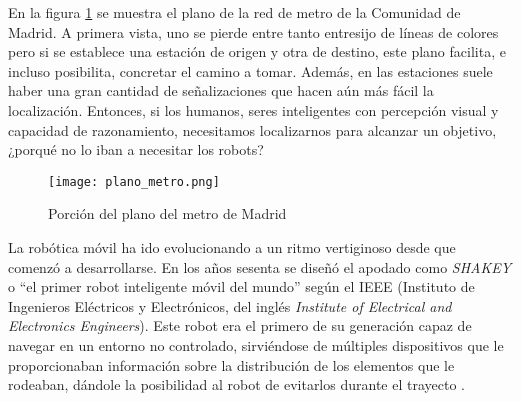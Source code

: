 
En la figura \ref{fig:metro} se muestra el plano de la red de metro de la Comunidad de Madrid. A primera vista, uno se pierde entre tanto entresijo de líneas de colores pero si se establece una estación de origen y otra de destino, este plano facilita, e incluso posibilita, concretar el camino a tomar. Además, en las estaciones suele haber una gran cantidad de señalizaciones que hacen aún más fácil la localización. Entonces, si los humanos, seres inteligentes con percepción visual y capacidad de razonamiento, necesitamos localizarnos para alcanzar un objetivo, ¿porqué no lo iban a necesitar los robots? \\

\begin{figure}[h]
	\begin{center} 
	\texttt{[image: plano\_metro.png]}
	\end{center}
	\caption{Porción del plano del metro de Madrid \cite{metro_madrid}}
	\label{fig:metro}
\end{figure}


La robótica móvil ha ido evolucionando a un ritmo vertiginoso desde que comenzó a desarrollarse. En los años sesenta se diseñó el apodado como \textit{SHAKEY} o ``el primer robot inteligente móvil del mundo'' según el IEEE (Instituto de Ingenieros Eléctricos y Electrónicos, del inglés \textit{Institute of Electrical and Electronics Engineers}). Este robot era el primero de su generación capaz de navegar en un entorno no controlado, sirviéndose de múltiples dispositivos que le proporcionaban información sobre la distribución de los elementos que le rodeaban, dándole la posibilidad al robot de evitarlos durante el trayecto \cite{shakey1}.\\


